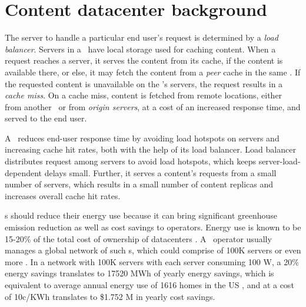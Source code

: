 
\section{Content datacenter background}
\label{sec:background}


The server to handle a particular end user's request is determined by a \emph{load balancer}. Servers in a \cdc\ have local storage used for caching content.  When a request reaches a server, it serves the content from its cache, if the content is available there, or else, it may fetch the content from a \emph{peer} cache in the same \cdc. If the requested content is unavailable on the \cdc's servers, the request results in a \emph{cache miss}. On a cache miss, content is fetched from remote locations, either from another \cdc\ or from \emph{origin servers}, at a cost of an increased response time, and served to the end user.


A  \cdc\ reduces end-user response time by avoiding load hotspots on servers and increasing cache hit rates, both with the help of its load balancer. Load balancer distributes request among servers to avoid load hotspots, which keeps server-load-dependent delays small. Further, it serves a content's requests from a small number of servers, which results in a small number of content replicas and increases overall cache hit rates.


\cdc s should reduce their energy use because it can bring significant greenhouse emission reduction as well as cost savings to operators. Energy use is known to be 15-20\% of the total cost of ownership of datacenters \cite{GreenbergCost, rasmussen2011determining, power-cost}. A \cdc\ operator usually manages a global network of such \cdc s, which could comprise of 100K servers or even more \cite{akamai-facts}. In a network with 100K servers with each server consuming 100 W,  a 20\% energy savings translates to 17520 MWh of yearly energy savings, which is equivalent to average annual energy use of 1616 homes in the US \cite{eia}, and at a cost of 10c/KWh translates to \$1.752 M in yearly cost savings.


